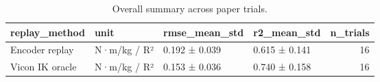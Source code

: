\begin{table}
\caption{Overall summary across paper trials.}
\label{tab:table3_overall}
\begin{tabular}{llllr}
\toprule
replay\_method & unit & rmse\_mean\_std & r2\_mean\_std & n\_trials \\
\midrule
Encoder replay & N·m/kg / R² & 0.192 ± 0.039 & 0.615 ± 0.141 & 16 \\
Vicon IK oracle & N·m/kg / R² & 0.153 ± 0.036 & 0.740 ± 0.158 & 16 \\
\bottomrule
\end{tabular}
\end{table}
